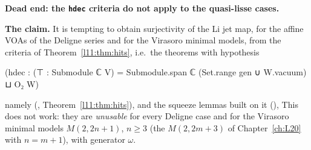 \label{l11:warn:hdec}
\begin{warning}
\textbf{Dead end: the \texttt{hdec} criteria do not apply to the quasi-lisse cases.}

\textbf{The claim.} It is tempting to obtain surjectivity of the Li jet map, for the affine VOAs of the Deligne series and
for the Virasoro minimal models, from the criteria of Theorem~\ref{l11:thm:hits}, i.e.\ the theorems with
hypothesis
\begin{plaincode}
(hdec : (⊤ : Submodule ℂ V) =
  Submodule.span ℂ (Set.range gen ∪ {W.vacuum}) ⊔ O₂ W)
\end{plaincode}
namely \allowbreak{}\allowbreak{}\allowbreak{}\allowbreak{}\allowbreak{}
(, Theorem~\ref{l11:thm:hits}),
\allowbreak{}\allowbreak{}\allowbreak{} and the
 squeeze lemmas built on it (), This does not work: they are
\emph{unusable} for every Deligne case and for the Virasoro minimal models $M(2,2n+1)$, $n\ge3$ (the $M(2,2m+3)$ of
Chapter~\ref{ch:L20} with $n=m+1$), with generator $\omega$.


\end{warning}
